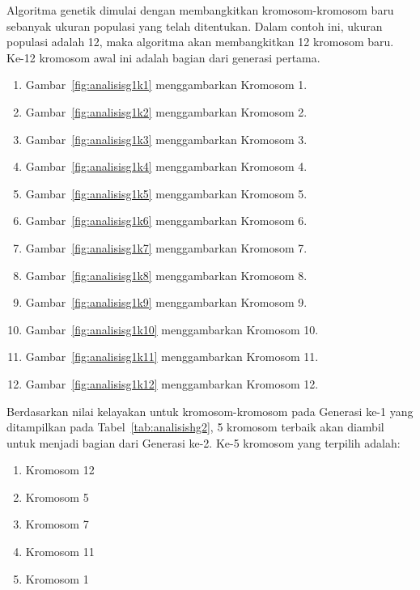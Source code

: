 Algoritma genetik dimulai dengan membangkitkan kromosom-kromosom baru sebanyak ukuran populasi yang telah ditentukan. Dalam contoh ini, ukuran populasi adalah 12, maka algoritma akan membangkitkan 12 kromosom baru. Ke-12 kromosom awal ini adalah bagian dari generasi pertama. 
\begin{enumerate}
\item Gambar~\ref{fig:analisisg1k1} menggambarkan Kromosom 1.
\item Gambar~\ref{fig:analisisg1k2} menggambarkan Kromosom 2.
\item Gambar~\ref{fig:analisisg1k3} menggambarkan Kromosom 3.
\item Gambar~\ref{fig:analisisg1k4} menggambarkan Kromosom 4.
\item Gambar~\ref{fig:analisisg1k5} menggambarkan Kromosom 5.
\item Gambar~\ref{fig:analisisg1k6} menggambarkan Kromosom 6.
\item Gambar~\ref{fig:analisisg1k7} menggambarkan Kromosom 7.
\item Gambar~\ref{fig:analisisg1k8} menggambarkan Kromosom 8.
\item Gambar~\ref{fig:analisisg1k9} menggambarkan Kromosom 9.
\item Gambar~\ref{fig:analisisg1k10} menggambarkan Kromosom 10.
\item Gambar~\ref{fig:analisisg1k11} menggambarkan Kromosom 11.
\item Gambar~\ref{fig:analisisg1k12} menggambarkan Kromosom 12.
\end{enumerate}

\clearpage

Berdasarkan nilai kelayakan untuk kromosom-kromosom pada Generasi ke-1 yang ditampilkan pada Tabel~\ref{tab:analisishg2}, 5 kromosom terbaik akan diambil untuk menjadi bagian dari Generasi ke-2. Ke-5 kromosom yang terpilih adalah:
\begin{enumerate}
\item Kromosom 12
\item Kromosom 5
\item Kromosom 7
\item Kromosom 11
\item Kromosom 1
\end{enumerate}


